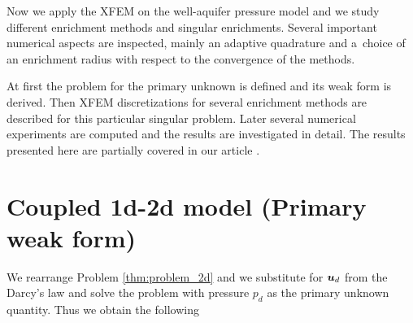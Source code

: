 

Now we apply the XFEM on the well-aquifer pressure model and we study different enrichment methods and singular enrichments.
Several important numerical aspects are inspected, mainly an adaptive quadrature and
a~choice of an enrichment radius with respect to the convergence of the methods.

At first the problem for the primary unknown is defined and its weak form is derived. Then
XFEM discretizations for several enrichment methods are described for this particular singular problem.
Later several numerical experiments are computed and the results are investigated in detail.
The results presented here are partially covered in our article \cite{exner_2016}.


\section{Coupled 1d-2d model (Primary weak form)}
\label{sec:primary_form}

We rearrange Problem \ref{thm:problem_2d} and we substitute for $\mathbf{\boldsymbol{u}}_d$ from the Darcy's law and solve the problem
with pressure $p_d$ as the primary unknown quantity. Thus we obtain the following


